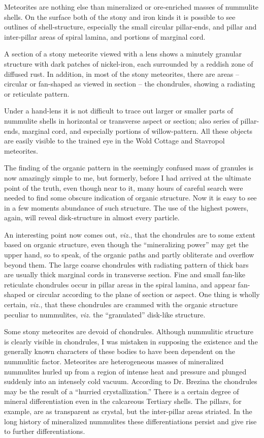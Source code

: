 \documentclass[a4paper, 12pt, oneside]{article}
\begin{document}
Meteorites are nothing else than mineralized or ore-enriched masses of nummulite shells. On the surface both of the stony and iron kinds it is possible to see outlines of shell-structure, especially the small circular pillar-ends, and pillar and inter-pillar areas of spiral lamina, and portions of marginal cord.

A section of a stony meteorite viewed with a lens shows a minutely granular structure with dark patches of nickel-iron, each surrounded by a reddish zone of diffused rust. In addition, in most of the stony meteorites, there are areas -- circular or fan-shaped as viewed in section -- the chondrules, showing a radiating or reticulate pattern.

Under a hand-lens it is not difficult to trace out larger or smaller parts of nummulite shells in horizontal or transverse aspect or section; also series of pillar-ends, marginal cord, and especially portions of willow-pattern. All these objects are easily visible to the trained eye in the Wold Cottage and Stavropol meteorites.

The finding of the organic pattern in the seemingly confused mass of granules is now amazingly simple to me, but formerly, before I had arrived at the ultimate point of the truth, even though near to it, many hours of careful search were needed to find some obscure indication of organic structure. Now it is easy to see in a few moments abundance of such structure. The use of the highest powers, again, will reveal disk-structure in almost every particle.

An interesting point now comes out, \emph{viz.}, that the chondrules are to some extent based on organic structure, even though the ``mineralizing power'' may get the upper hand, so to speak, of the organic paths and partly obliterate and overflow beyond them. The large coarse chondrules with radiating pattern of thick bars are usually thick marginal cords in transverse section. Fine and small fan-like reticulate chondrules occur in pillar areas in the spiral lamina, and appear fan-shaped or circular according to the plane of section or aspect. One thing is wholly certain, \emph{viz.}, that these chondrules are crammed with the organic structure peculiar to nummulites, \emph{viz.} the ``granulated'' disk-like structure.

Some stony meteorites are devoid of chondrules. Although nummulitic structure is clearly visible in chondrules, I was mistaken in supposing the existence and the generally known characters of these bodies to have been dependent on the nummulitic factor. Meteorites are heterogeneous masses of mineralized nummulites hurled up from a region of intense heat and pressure and plunged suddenly into an intensely cold vacuum. According to Dr. Brezina the chondrules may be the result of a ``hurried crystallization.'' There is a certain degree of mineral differentiation even in the calcareous Tertiary shells. The pillars, for example, are as transparent as crystal, but the inter-pillar areas striated. In the long history of mineralized nummulites these differentiations persist and give rise to further differentiations.
\end{document}
